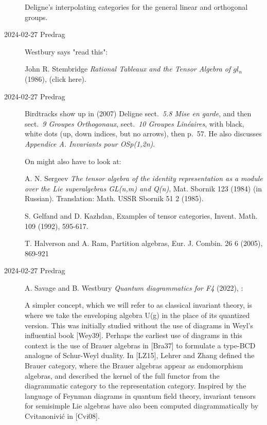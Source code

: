 \begin{description}
Deligne’s interpolating categories for the
general linear and orthogonal groups.


\item[2024-02-27 Predrag] Westbury says "read this":

John R. Stembridge
{\em Rational Tableaux and the Tensor Algebra of $gl_n$} (1986),
 {(click here)}.

\item[2024-02-27 Predrag] Birdtracks show up in (2007)
Deligne sect.~{\em 5.8 Mise en garde}, and
then sect.~{\em 9 Groupes Orthogonaux},
sect.~{\em 10 Groupes Lin\'eaires}, with black, white dots (up, down indices,
but no arrows), then p.~57. He also discusses
{\em Appendice A. Invariants pour OSp(1,2n)}.

On might also have to look at:

A. N. Sergeev {\em The tensor algebra of the identity representation as a
module over the Lie superalgebras GL(n,m) and Q(n)}, Mat. Sbornik
123 (1984) (in Russian). Translation: Math. USSR Sbornik 51 2
(1985).

S. Gelfand and D. Kazhdan, Examples of tensor categories, Invent.
Math. 109 (1992), 595-617.

T. Halverson and A. Ram, Partition algebras, Eur. J. Combin. 26 6
(2005), 869-921

\item[2024-02-27 Predrag]
A. Savage and B. Westbury
{\em Quantum diagrammatics for F4} (2022), :

A simpler concept, which we will refer to as classical invariant theory,
is where we take the enveloping algebra U(g) in the place of its
quantized version. This was initially studied without the use of diagrams
in Weyl’s influential book [Wey39]. Perhaps the earliest use of diagrams
in this context is the use of Brauer algebras in [Bra37] to formulate a
type-BCD analogue of Schur-Weyl duality. In [LZ15], Lehrer and Zhang
defined the Brauer category, where the Brauer algebras appear as
endomorphism algebras, and described the kernel of the full functor from
the diagrammatic category to the representation category. Inspired by the
language of Feynman diagrams in quantum field theory, invariant tensors
for semisimple Lie algebras have also been computed diagrammatically by
Cvitanonivi\'c in [Cvi08].






\end{description}
\renewcommand{\ssp}{a}


\printbibliography[heading=subbibintoc,title={References}]
